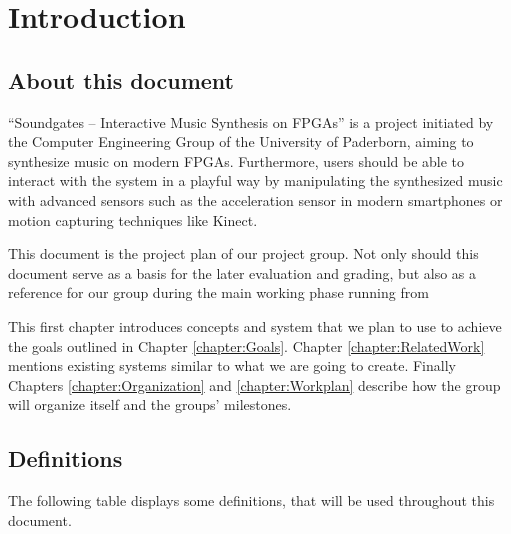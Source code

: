 \chapter{Introduction}
	\label{chapter:Introduction}
	\section{About this document}
	
"`Soundgates – Interactive Music Synthesis on FPGAs"' is a project initiated by the Computer Engineering Group of the University of Paderborn, aiming to synthesize music on modern FPGAs. 
Furthermore, users should be able to interact with the system in a playful way by manipulating the synthesized music with advanced sensors such as the acceleration sensor in modern smartphones or motion capturing techniques like Kinect.


This document is the project plan of our project group.
Not only should this document serve as a basis for the later evaluation and grading, 
but also as a reference for our group during the main working phase running from 

This first chapter introduces concepts and system that we plan to use to achieve the goals outlined in Chapter \ref{chapter:Goals}. 
Chapter \ref{chapter:RelatedWork} mentions existing systems similar to what we are going to create.
Finally Chapters \ref{chapter:Organization} and \ref{chapter:Workplan} describe how the group will organize itself and the groups' milestones.

	\section{Definitions}
	 The following table displays some definitions, that will be used throughout this document.
	
	 
